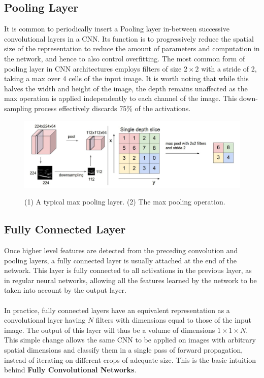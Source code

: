 \documentclass[12pt, a4paper]{report}
\begin{document}
\subsection{Pooling Layer}
It is common to periodically insert a Pooling layer in-between successive convolutional layers in a CNN. Its function is to progressively reduce the spatial size of the representation to reduce the amount of parameters and computation in the network, and hence to also control overfitting.\cite{cs231n} The most common form of pooling layer in CNN architectures employs filters of size $2 \times 2$ with a stride of 2, taking a max over 4 cells of the input image. It is worth noting that while this halves the width and height of the image, the depth remains unaffected as the max operation is applied independently to each channel of the image. This down-sampling process effectively discards 75\% of the activations.
\begin{figure}[h]
\centering
\includegraphics[width=\textwidth]{cnn2.jpg}
\caption{(1) A typical max pooling layer. (2) The max pooling operation.}\cite{cs231n}
\end{figure}
\subsection{Fully Connected Layer}
Once higher level features are detected from the preceding convolution and pooling layers, a fully connected layer is usually attached at the end of the network. This layer is fully connected to all activations in the previous layer, as in regular neural networks, allowing all the features learned by the network to be taken into account by the output layer. \paragraph{}
In practice, fully connected layers have an equivalent representation as a convolutional layer having $N$ filters with dimensions equal to those of the input image. The output of this layer will thus be a volume of dimensions $1 \times 1 \times N$. This simple change allows the same CNN to be applied on images with arbitrary spatial dimensions and classify them in a single pass of forward propagation, instead of iterating on different crops of adequate size. This is the basic intuition behind \textbf{Fully Convolutional Networks}.\cite{long2015fully}
\end{document}
